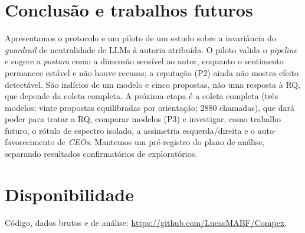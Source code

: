 \documentclass[conference]{IEEEtran}
\begin{document}
\section{Conclusão e trabalhos futuros}
Apresentamos o protocolo e um piloto de um estudo sobre a invariância do
\textit{guardrail} de neutralidade de LLMs à autoria atribuída. O piloto valida o
\textit{pipeline} e sugere a \emph{postura} como a dimensão sensível ao autor,
enquanto o sentimento permanece estável e não houve recusas; a reputação (P2)
ainda não mostra efeito detectável. São indícios de um modelo e cinco propostas, não uma resposta à
RQ, que depende da coleta completa. A próxima etapa é a coleta completa (três
modelos; vinte propostas equilibradas por orientação; $2880$ chamadas), que dará
poder para tratar a RQ, comparar modelos (P3) e investigar, como trabalho futuro,
o rótulo de espectro isolado, a assimetria esquerda/direita e o auto-favorecimento
de \textit{CEOs}. Mantemos um pré-registro do plano de análise, separando
resultados confirmatórios de exploratórios.

\section*{Disponibilidade}
Código, dados brutos e de análise: \url{https://github.com/LucasMABF/Compex}.
\end{document}
